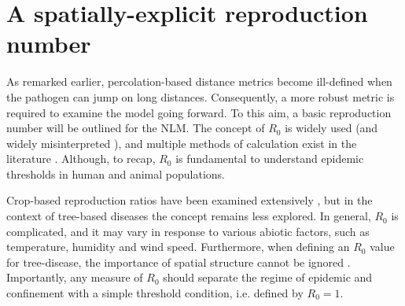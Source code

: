 
\section{A spatially-explicit reproduction number}
\label{sec:spatially-explicit-reproduction-ration}

As remarked earlier, percolation-based distance metrics become ill-defined when the pathogen can jump on long distances.
Consequently, a more robust metric is required to examine the model going forward.
To this aim, a basic reproduction number will be outlined for the NLM.
The concept of $R_0$ is widely used (and widely misinterpreted \cite{delamater2019complexity}),
and multiple methods of calculation exist in the literature \cite{perspectives-on-r0}.
Although, to recap, $R_0$ is fundamental to understand epidemic thresholds in human and animal populations. 

Crop-based reproduction ratios have been examined extensively
\cite{gubbins2000population, park2001invasion, doi:10.1146/annurev.phyto.011108.135838, van2011periodic},
but in the context of tree-based diseases the concept remains less explored. 
In general, $R_0$ is complicated, and it may vary in response to various abiotic factors, such as temperature, humidity and wind speed.
Furthermore, when defining an $R_0$ value for tree-disease, the importance of spatial structure cannot be
ignored \cite{park2001invasion}.
Importantly, any measure of $R_0$ should separate the regime of epidemic and confinement with a simple threshold condition, i.e. defined by $R_0=1$.

